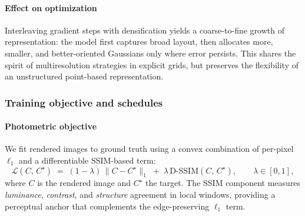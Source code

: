 \begin{enrichment}
\begin{enrichment}
\begin{enrichment}
        \paragraph{Effect on optimization}
        Interleaving gradient steps with densification yields a coarse-to-fine growth of representation: the model first captures broad layout, then allocates more, smaller, and better-oriented Gaussians only where error persists. 
        This shares the spirit of multiresolution strategies in explicit grids, but preserves the flexibility of an unstructured point-based representation.
        
        \subsubsection{Training objective and schedules}\label{enr:subsubsec_chapter23_objective}
        
        \paragraph{Photometric objective}
        We fit rendered images to ground truth using a convex combination of per-pixel $\ell_1$ and a differentiable SSIM-based term:
        \[
        \mathcal{L}(C,\,C^\star)\;=\;(1-\lambda)\,\|C-C^\star\|_1\;+\;\lambda\,\mathrm{D\text{-}SSIM}(C,\,C^\star),
        \qquad \lambda\in[0,1],
        \]
        where $C$ is the rendered image and $C^\star$ the target. The SSIM component measures \emph{luminance}, \emph{contrast}, and \emph{structure} agreement in local windows, providing a perceptual anchor that complements the edge-preserving $\ell_1$ term.
        

\end{enrichment}
\end{enrichment}
\end{enrichment}
